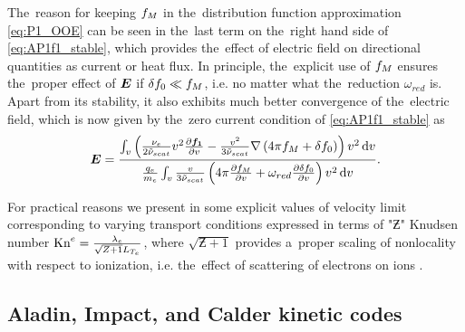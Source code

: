 The~reason for keeping $f_M$ in the~distribution function approximation
\eqref{eq:P1_OOE} can be seen in the~last term on the~right hand side of 
\eqref{eq:AP1f1_stable}, which provides the~effect of electric field on
directional quantities as current or heat flux. In principle, the~explicit use
of $f_M$ ensures the~proper effect of $\boldsymbol{E}$ if $\delta f_0 \ll f_M$, i.e.
no matter what the~reduction $\omega_{red}$ is. Apart from its stability,
it also exhibits much better convergence of the~electric field, which is now
given by the~zero current condition of \eqref{eq:AP1f1_stable} as
\begin{equation}
  \boldsymbol{E} =
  \frac{\int_{v} \left(\frac{\nu_{e}}{2\tilde{\nu}_{scat}}v^2\frac{\partial{\boldsymbol{f_1}}}{\partial{v}}
  - \frac{v^2}{3\tilde{\nu}_{scat}}
  \nabla\left(4\pi f_M + \delta f_0\right)\right) v^2\, \text{d}v}
  {\frac{q_e}{m_e}\int_{v} \frac{v}
  {3\tilde{\nu}_{scat}}
  \left(4\pi\frac{\partial{f_M}}{\partial{v}} + \omega_{red} \frac{\partial{\delta f_0}}{\partial{v}}\right)
  v^2\, \text{d}v} .
  \label{eq:AP1_Efield_stable}
\end{equation}

For practical reasons we present in  
some explicit values of velocity limit corresponding to varying transport 
conditions expressed in terms of "$\Zbar$" Knudsen number 
$\text{Kn}^e = \frac{\lambda_e}{\sqrt{Z + 1}L_{T_e}}$, 
where $\sqrt{\Zbar + 1}$ provides a~proper scaling of nonlocality with respect
to ionization, i.e. the~effect of scattering of electrons on ions 
\cite{LMV_1983_7}.


\subsection{Aladin, Impact, and Calder kinetic codes}
\label{sec:AladinImpactCaldercodes}

